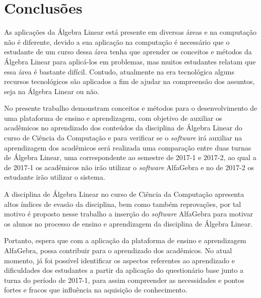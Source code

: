 \chapter{Conclusões}
\label{cap:conclusoes}

\noindent As aplicações da Álgebra Linear está presente em diversas áreas e na computação não é diferente, devido a sua aplicação na computação é necessário que o estudante de um curso dessa área tenha que aprender os conceitos e métodos da Álgebra Linear para aplicá-los em problemas, mas muitos estudantes relatam que essa área é bastante difícil. Contudo, atualmente na era tecnológica alguns recursos tecnológicos são aplicados a fim de ajudar na compreensão dos assuntos, seja na Álgebra Linear ou não.

No presente trabalho demonstram conceitos e métodos para o desenvolvimento de uma plataforma de ensino e aprendizagem, com objetivo de auxiliar os acadêmicos no aprendizado dos conteúdos da disciplina de Álgebra Linear do curso de Ciência da Computação e para verificar se o \textit{software} irá auxiliar na aprendizagem dos acadêmicos será realizada uma comparação entre duas turnas de Álgebra Linear, uma correspondente ao semestre de 2017-1 e 2017-2, ao qual a de 2017-1 os acadêmicos não irão utilizar o \textit{software} AlfaGebra e no de 2017-2 os estudante irão utilizar o sistema.

A disciplina de Álgebra Linear no curso de Ciência da Computação apresenta altos índices de evasão da disciplina, bem como também reprovações, por tal motivo é proposto nesse trabalho a inserção do \textit{software} AlfaGebra para motivar os alunos no processo de ensino e aprendizagem da disciplina de Álgebra Linear.

Portanto, espera que com a aplicação da plataforma de ensino e aprendizagem AlfaGebra, possa contribuir para o aprendizado dos acadêmicos. No atual momento, já foi possível identificar os aspectos referentes ao aprendizado e dificuldades dos estudantes a partir da aplicação do questionário base junto a turna do período de 2017-1, para assim compreender as necessidades e pontos fortes e fracos que influência na aquisição de conhecimento.
